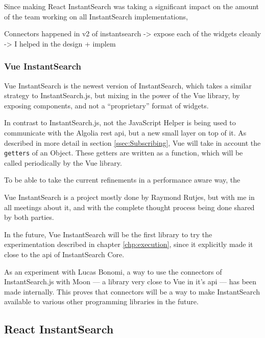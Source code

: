 Since making React InstantSearch was taking a significant impact on the amount of the team working on all InstantSearch implementations, %

Connectors happened in v2 of instantsearch
-> expose each of the widgets cleanly
-> I helped in the design + implem %


\subsubsection{Vue InstantSearch} %
\label{ssub:vue_instantsearch}

Vue InstantSearch is the newest version of InstantSearch, which takes a similar strategy to InstantSearch.js, but mixing in the power of the Vue \gls{library}, by exposing components, and not a ``proprietary'' format of widgets.

In contrast to InstantSearch.js, not the JavaScript Helper is being used to communicate with the Algolia \acrshort{rest} \acrshort{api}, but a new small layer on top of it. As described in more detail in section \ref{ssec:Subscribing}, Vue will take in account the {\tt getters} of an Object. These getters are written as a function, which will be called periodically by the Vue \gls{library}. 

To be able to take the current refinements in a performance aware way, the 

Vue InstantSearch is a project mostly done by Raymond Rutjes, but with me in all meetings about it, and with the complete thought process being done shared by both parties.

In the future, Vue InstantSearch will be the first \gls{library} to try the experimentation described in chapter \ref{chp:execution}, since it explicitly made it close to the \acrshort{api} of InstantSearch Core.

As an experiment with Lucas Bonomi, a way to use the connectors of InstantSearch.js with Moon --- a \gls{library} very close to Vue in it's \acrshort{api} --- has been made internally. This proves that connectors will be a way to make InstantSearch available to various other programming libraries in the future.




\subsection{React InstantSearch} %
\label{sub:react_instantearch}

